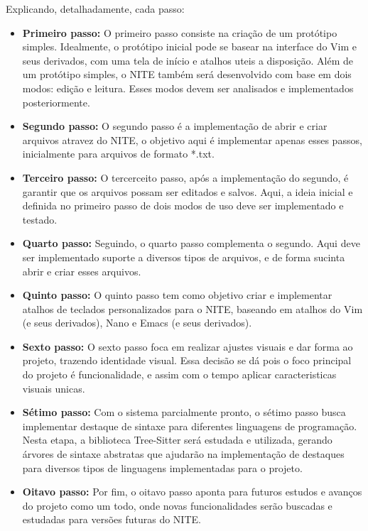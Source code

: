 Explicando, detalhadamente, cada passo:

\begin{itemize}
    \item \textbf{Primeiro passo:} O primeiro passo consiste na criação de um protótipo simples. Idealmente, o protótipo inicial
    pode se basear na interface do Vim e seus derivados, com uma tela de início e atalhos uteis a disposição. Além de um protótipo simples,
    o NITE também será desenvolvido com base em dois modos: edição e leitura. Esses modos devem ser analisados e implementados posteriormente.
    \item \textbf{Segundo passo:} O segundo passo é a implementação de abrir e criar arquivos atravez do NITE, o objetivo aqui é implementar
    apenas esses passos, inicialmente para arquivos de formato *.txt.
    \item \textbf{Terceiro passo:} O tercerceito passo, após a implementação do segundo, é garantir que os arquivos possam ser editados e salvos.
    Aqui, a ideia inicial e definida no primeiro passo de dois modos de uso deve ser implementado e testado.
    \item \textbf{Quarto passo:} Seguindo, o quarto passo complementa o segundo. Aqui deve ser implementado suporte a diversos tipos de
    arquivos, e de forma sucinta abrir e criar esses arquivos.
    \item \textbf{Quinto passo:} O quinto passo tem como objetivo criar e implementar atalhos de teclados personalizados para o NITE, baseando em
    atalhos do Vim (e seus derivados), Nano e Emacs (e seus derivados).
    \item \textbf{Sexto passo:} O sexto passo foca em realizar ajustes visuais e dar forma ao projeto, trazendo identidade visual. Essa decisão se dá pois o foco principal do projeto é funcionalidade, e assim com o tempo aplicar caracteristicas visuais unicas.
    \item \textbf{Sétimo passo:} Com o sistema parcialmente pronto, o sétimo passo busca implementar destaque de sintaxe para diferentes
    linguagens de programação. Nesta etapa, a biblioteca Tree-Sitter \cite{tree-sitter} será estudada e utilizada, gerando árvores de sintaxe abstratas que ajudarão na implementação de destaques para diversos tipos de linguagens implementadas para o projeto.
    \item \textbf{Oitavo passo:} Por fim, o oitavo passo aponta para futuros estudos e avanços do projeto como um todo, onde novas funcionalidades
    serão buscadas e estudadas para versões futuras do NITE.
\end{itemize}

